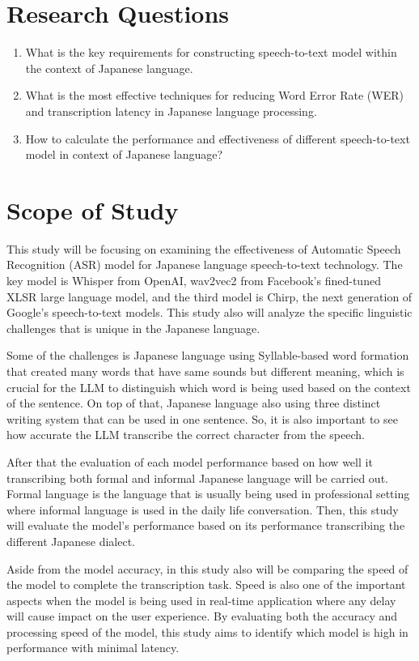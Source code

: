 \section{Research Questions}
\begin{enumerate}
    \item What is the key requirements for constructing speech-to-text model within the context of Japanese language.
    
    \item What is the most effective techniques for reducing Word Error Rate (WER) and transcription latency in Japanese language processing.

    \item How to calculate the performance and effectiveness of different speech-to-text model in context of Japanese language?
\end{enumerate}


\section{Scope of Study}
This study will be focusing on examining the effectiveness of Automatic Speech Recognition (ASR) model for Japanese language speech-to-text technology. The key model is Whisper from OpenAI, wav2vec2 from Facebook's fined-tuned XLSR large language model, and the third model is Chirp, the next generation of Google's speech-to-text models. This study also will analyze the specific linguistic challenges that is unique in the Japanese language. 

Some of the challenges is Japanese language using Syllable-based word formation that created many words that have same sounds but different meaning, which is crucial for the LLM to distinguish which word is being used based on the context of the sentence. On top of that, Japanese language also using three distinct writing system that can be used in one sentence. So, it is also important to see how accurate the LLM transcribe the correct character from the speech. 

After that the evaluation of each model performance based on how well it transcribing both formal and informal Japanese language will be carried out. Formal language is the language that is usually being used in professional setting where informal language is used in the daily life conversation. Then, this study will evaluate the model's performance based on its performance transcribing the different Japanese dialect. 

Aside from the model accuracy, in this study also will be comparing the speed of the model to complete the transcription task. Speed is also one of the important aspects when the model is being used in real-time application where any delay will cause impact on the user experience. By evaluating both the accuracy and processing speed of the model, this study aims to identify which model is high in performance with minimal latency.  


